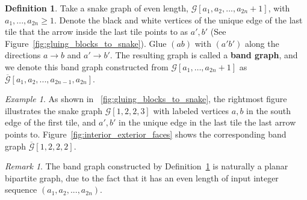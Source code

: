 \documentclass[11pt]{amsart}
\theoremstyle{definition}
\newtheorem{defn}[thm]{Definition}
\theoremstyle{remark}
\newtheorem{exmp}[thm]{Example}
\newtheorem{rem}[thm]{Remark}
\numberwithin{equation}{section}
\newcommand{\calG}{\mathcal{G}}
\begin{document}
\begin{defn}\label{defn: even_length_band_graph}
    Take a snake graph of even length, $\mathcal{G}[a_1,a_2,...,a_{2n}+1]$, with $a_1,...,a_{2n}\geq 1$. Denote the black and white vertices of the unique edge of the last tile that the arrow inside the last tile points to as $a',b'$ (See Figure~\ref{fig:gluing_blocks_to_snake}).
    Glue $(ab)$ with $(a'b')$ along the directions $a\rightarrow b$ and $a'\rightarrow b'$. The resulting graph is called a \textbf{band graph}, and we denote this band graph constructed from $\calG[a_1,\ldots,a_{2n}+1]$ as $\overline{\mathcal{G}}[a_1,a_2,...,a_{2n-1},a_{2n}]$. 
\end{defn}




\begin{exmp}
    As shown in ~\ref{fig:gluing_blocks_to_snake}, the rightmost figure illustrates the snake graph $\calG[1,2,2,3]$ with labeled vertices $a,b$ in the south edge of the first tile, and $a',b'$ in the unique edge in the last tile the last arrow points to. Figure~\ref{fig:interior_exterior_faces} shows the corresponding band graph $\overline{\calG}[1,2,2,2]$.
\end{exmp}

\begin{rem}\label{rem: planarity_of_even_band}
    The band graph constructed by Definition~\ref{defn: even_length_band_graph} is naturally a planar bipartite graph, due to the fact that it has an even length of input integer sequence $(a_1,a_2,...,a_{2n})$.
\end{rem}
\end{document}
